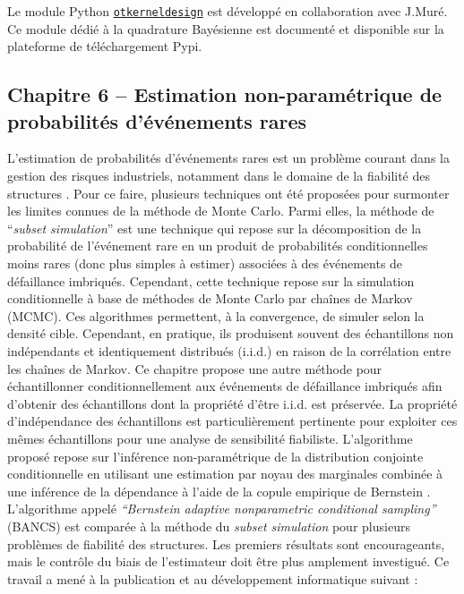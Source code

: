 \noindent
{} Le module Python \href{https://efekhari27.github.io/otkerneldesign/master/}{\texttt{otkerneldesign}} est développé en collaboration avec J.Muré. Ce module dédié à la quadrature Bayésienne est documenté et disponible sur la plateforme de téléchargement Pypi. 


\subsection*{Chapitre 6 -- Estimation non-paramétrique de probabilités d'événements rares \label{sec:chap6}}

L'estimation de probabilités d'événements rares est un problème courant dans la gestion des risques industriels, notamment dans le domaine de la fiabilité des structures \cite{chabridon_2018_thesis}. 
Pour ce faire, plusieurs techniques ont été proposées pour surmonter les limites connues de la méthode de Monte Carlo. 
Parmi elles, la méthode de ``\textit{subset simulation}'' \cite{AuBeck2001} est une technique qui repose sur la décomposition de la probabilité de l'événement rare en un produit de probabilités conditionnelles moins rares (donc plus simples à estimer) associées à des événements de défaillance imbriqués. 
Cependant, cette technique repose sur la simulation conditionnelle à base de méthodes de Monte Carlo par chaînes de Markov (MCMC). 
Ces algorithmes permettent, à la convergence, de simuler selon la densité cible. 
Cependant, en pratique, ils produisent souvent des échantillons non indépendants et identiquement distribués (i.i.d.) en raison de la corrélation entre les chaînes de Markov. 
Ce chapitre propose une autre méthode pour échantillonner conditionnellement aux événements de défaillance imbriqués afin d'obtenir des échantillons dont la propriété d'être i.i.d. est préservée. 
La propriété d'indépendance des échantillons est particulièrement pertinente pour exploiter ces mêmes échantillons pour une analyse de sensibilité fiabiliste. 
L'algorithme proposé repose sur l'inférence non-paramétrique de la distribution conjointe conditionnelle en utilisant une estimation par noyau des marginales combinée à une inférence de la dépendance à l'aide de la copule empirique de Bernstein \cite{sancetta_satchell_2004}. 
L'algorithme appelé \textit{``Bernstein adaptive nonparametric conditional sampling''} (BANCS) est comparée à la méthode du \textit{subset simulation} pour plusieurs problèmes de fiabilité des structures. 
Les premiers résultats sont encourageants, mais le contrôle du biais de l'estimateur doit être plus amplement investigué. 
Ce travail a mené à la publication et au développement informatique suivant : \\

